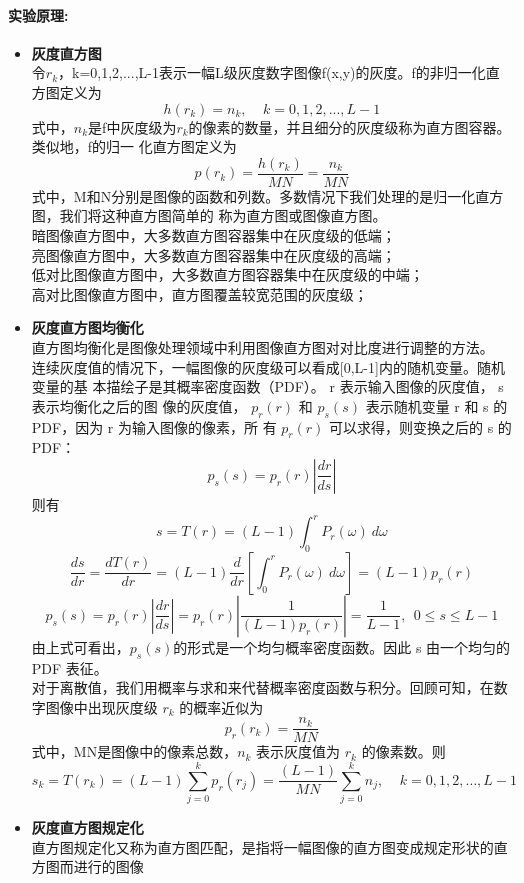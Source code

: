 \documentclass{ctexart}
\begin{document}
\paragraph{实验原理:} 
\begin{itemize}
\item \textbf{灰度直方图}\\
令$r_k$，k=0,1,2,...,L-1表示一幅L级灰度数字图像f(x,y)的灰度。f的非归一化直方图定义为
\[
    h(r_k)=n_k,~~~~~ k=0,1,2,...,L-1
\]
式中，$n_k$是f中灰度级为$r_k$的像素的数量，并且细分的灰度级称为直方图容器。类似地，f的归一
化直方图定义为
\[
    p(r_k) = \frac{h(r_k)}{MN} = \frac{n_k}{MN}  
\]
式中，M和N分别是图像的函数和列数。多数情况下我们处理的是归一化直方图，我们将这种直方图简单的
称为直方图或图像直方图。\\
暗图像直方图中，大多数直方图容器集中在灰度级的低端；\\
亮图像直方图中，大多数直方图容器集中在灰度级的高端；\\
低对比图像直方图中，大多数直方图容器集中在灰度级的中端；\\
高对比图像直方图中，直方图覆盖较宽范围的灰度级；\\
\item \textbf{灰度直方图均衡化}\\
直方图均衡化是图像处理领域中利用图像直方图对对比度进行调整的方法。\\
连续灰度值的情况下，一幅图像的灰度级可以看成[0,L-1]内的随机变量。随机变量的基
本描绘子是其概率密度函数（PDF）。 r 表示输入图像的灰度值， s 表示均衡化之后的图
像的灰度值， $p_r(r)$ 和 $p_s(s)$ 表示随机变量 r 和 s 的 PDF，因为 r 为输入图像的像素，所
有 $p_r(r)$ 可以求得，则变换之后的 s 的 PDF：
\[
    p_s(s) = p_r(r)|\frac{dr}{ds}|
\]
则有
\[
    s = T(r) = (L-1)\int_0^r P_r(\omega)~d\omega
\]
\[
    \frac{ds}{dr} = \frac{dT(r)}{dr} = (L-1)\frac{d}{dr} [\int_0^r P_r(\omega)~
    d\omega] = (L-1)p_r(r)
\]
\[
    p_s(s) = p_r(r)|\frac{dr}{ds}| = p_r(r)|\frac{1}{(L-1)p_r(r)}| = \frac{1}{L-1},
    ~~0\leq s \leq L-1 
\]
由上式可看出，$p_s(s)$的形式是一个均匀概率密度函数。因此 s 由一个均匀的 PDF 表征。\\
对于离散值，我们用概率与求和来代替概率密度函数与积分。回顾可知，在数字图像中出现灰度级 $r_k$ 
的概率近似为
\[
    p_r(r_k) = \frac{n_k}{MN}
\]
式中，MN是图像中的像素总数，$n_k$ 表示灰度值为 $r_k$ 的像素数。则
\[
    s_k = T(r_k) = (L-1)\sum_{j=0}^k p_r(r_j) = \frac{(L-1)}{MN} \sum_{j=0}^k n_j,
    ~~~~~ k=0,1,2,…,L-1
\]
\item \textbf{灰度直方图规定化}\\
直方图规定化又称为直方图匹配，是指将一幅图像的直方图变成规定形状的直方图而进行的图像

\end{itemize}
\end{document}
